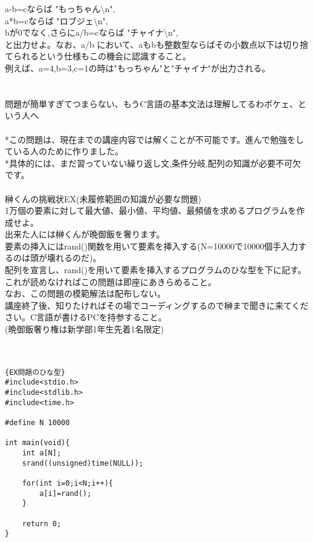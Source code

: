 \documentclass[a4j,titlepage,dvipdfmx]{jsarticle}   %
\begin{document}
a-b=cならば "もっちゃん\textbackslash n",\\
a*b=cならば "ロブジェ\textbackslash n",\\
bが0でなく,さらにa/b=cならば "チャイナ\textbackslash n",\\
と出力せよ。なお、a/b において、aもbも整数型ならばその小数点以下は切り捨てられるという仕様もこの機会に認識すること。\\
例えば、a=4,b=3,c=1の時は"もっちゃん"と"チャイナ"が出力される。\\
\\
\\
問題が簡単すぎてつまらない、もうC言語の基本文法は理解してるわボケェ、という人へ\\
\\
*この問題は、現在までの講座内容では解くことが不可能です。進んで勉強をしている人のために作りました。\\
*具体的には、まだ習っていない繰り返し文,条件分岐,配列の知識が必要不可欠です。\\
\\
榊くんの挑戦状EX(未履修範囲の知識が必要な問題)\\
1万個の要素に対して最大値、最小値、平均値、最頻値を求めるプログラムを作成せよ。\\
出来た人には榊くんが晩御飯を奢ります。\\
要素の挿入にはrand()関数を用いて要素を挿入する(N=10000で10000個手入力するのは頭が壊れるのだ)。\\
配列を宣言し、rand()を用いて要素を挿入するプログラムのひな型を下に記す。これが読めなければこの問題は即座にあきらめること。\\
なお、この問題の模範解法は配布しない。\\
講座終了後、知りたければその場でコーディングするので榊まで聞きに来てください。C言語が書けるPCを持参すること。\\
(晩御飯奢り権は新学部1年生先着1名限定)\\
\\
\\
\begin{lstlisting}{EX問題のひな型}
#include<stdio.h>
#include<stdlib.h>
#include<time.h>

#define N 10000

int main(void){
	int a[N];
	srand((unsigned)time(NULL));
	
	for(int i=0;i<N;i++){
		a[i]=rand();
	}
	
	return 0;
}
\end{lstlisting}
\end{document}
